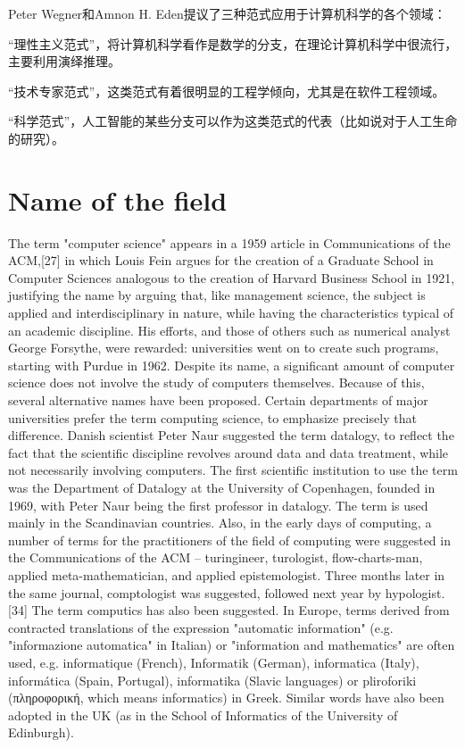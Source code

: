 Peter Wegner和Amnon H. Eden提议了三种范式应用于计算机科学的各个领域：

\begin{compactitem}
\item “理性主义范式”，将计算机科学看作是数学的分支，在理论计算机科学中很流行，主要利用演绎推理。
\item “技术专家范式”，这类范式有着很明显的工程学倾向，尤其是在软件工程领域。
\item “科学范式”，人工智能的某些分支可以作为这类范式的代表（比如说对于人工生命的研究）。
\end{compactitem}




\section{Name of the field}

The term "computer science" appears in a 1959 article in Communications of the ACM,[27] in which Louis Fein argues for the creation of a Graduate School in Computer Sciences analogous to the creation of Harvard Business School in 1921, justifying the name by arguing that, like management science, the subject is applied and interdisciplinary in nature, while having the characteristics typical of an academic discipline. His efforts, and those of others such as numerical analyst George Forsythe, were rewarded: universities went on to create such programs, starting with Purdue in 1962. Despite its name, a significant amount of computer science does not involve the study of computers themselves. Because of this, several alternative names have been proposed. Certain departments of major universities prefer the term computing science, to emphasize precisely that difference. Danish scientist Peter Naur suggested the term datalogy, to reflect the fact that the scientific discipline revolves around data and data treatment, while not necessarily involving computers. The first scientific institution to use the term was the Department of Datalogy at the University of Copenhagen, founded in 1969, with Peter Naur being the first professor in datalogy. The term is used mainly in the Scandinavian countries. Also, in the early days of computing, a number of terms for the practitioners of the field of computing were suggested in the Communications of the ACM – turingineer, turologist, flow-charts-man, applied meta-mathematician, and applied epistemologist. Three months later in the same journal, comptologist was suggested, followed next year by hypologist.[34] The term computics has also been suggested. In Europe, terms derived from contracted translations of the expression "automatic information" (e.g. "informazione automatica" in Italian) or "information and mathematics" are often used, e.g. informatique (French), Informatik (German), informatica (Italy), informática (Spain, Portugal), informatika (Slavic languages) or pliroforiki (πληροφορική, which means informatics) in Greek. Similar words have also been adopted in the UK (as in the School of Informatics of the University of Edinburgh).

